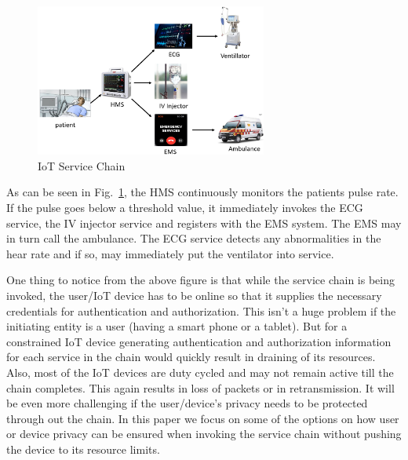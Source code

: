 \documentclass[journal]{IEEEtran}
\begin{document}
\begin{figure}[htbp]
\centerline{\includegraphics[width=3in]{chain.png}}
\caption{IoT Service Chain}
\label{fig:iotsvc}
\end{figure}

As can be seen in Fig.~\ref{fig:iotsvc}, the HMS continuously monitors the patients pulse rate. If the pulse goes below a threshold value, it immediately invokes the ECG service, the IV injector service and registers with the EMS system. The EMS may in turn call the ambulance. The ECG service detects any abnormalities in the hear rate and if so, may immediately put the ventilator into service.

One thing to notice from the above figure is that while the service chain is being invoked, the user/IoT device has to be online so that it supplies the necessary credentials for authentication and authorization.  This isn't a huge problem if the initiating entity is a user (having a smart phone or a tablet). But for a constrained IoT device generating authentication and authorization information for each service in the chain would quickly result in draining of its resources. Also, most of the IoT devices are duty cycled and may not remain active till the chain completes. This again results in loss of packets or in retransmission. It will be even more challenging if the user/device's privacy needs to be protected through out the chain. In this paper we focus on some of the options on how user or device privacy can be ensured when invoking the service chain without pushing the device to its resource limits.
\end{document}
